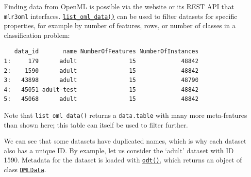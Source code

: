 Finding data from OpenML is possible via the website or its REST API
that \texttt{mlr3oml} interfaces.
\href{https://mlr3oml.mlr-org.com/reference/list_oml.html}{\texttt{list\_oml\_data()}}
can be used to filter datasets for specific properties, for example by
number of features, rows, or number of classes in a classification
problem:

\begin{Shaded}
\begin{Highlighting}[]

\OtherTok{=} \NormalTok{(}
   \NormalTok{(}\NormalTok{, }\NormalTok{),}
   \NormalTok{(}\NormalTok{, }\NormalTok{),}
   
\NormalTok{)}
\end{Highlighting}
\end{Shaded}

\begin{Shaded}
\begin{Highlighting}[]
\NormalTok{odatasets[NumberOfFeatures }\SpecialCharTok{\textless{}} \NormalTok{,}
  \NormalTok{(}\NormalTok{, }\NormalTok{, }\NormalTok{, }\NormalTok{)]}
\end{Highlighting}
\end{Shaded}

\begin{verbatim}
   data_id       name NumberOfFeatures NumberOfInstances
1:     179      adult               15             48842
2:    1590      adult               15             48842
3:   43898      adult               15             48790
4:   45051 adult-test               15             48842
5:   45068      adult               15             48842
\end{verbatim}

Note that \texttt{list\_oml\_data()} returns a \texttt{data.table} with
many more meta-features than shown here; this table can itself be used
to filter further.

We can see that some datasets have duplicated names, which is why each
dataset also has a unique ID. By example, let us consider the `adult'
dataset with ID 1590. Metadata for the dataset is loaded with
\href{https://mlr3oml.mlr-org.com/reference/oml_sugar.html}{\texttt{odt()}},
which returns an object of class
\href{https://mlr3oml.mlr-org.com/reference/oml_data.html}{\texttt{OMLData}}.


